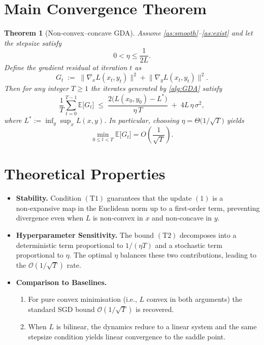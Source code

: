 \documentclass{article}
\newtheorem{theorem}{Theorem}
\newcommand{\E}{\mathbb{E}}
\begin{document}
\section*{Main Convergence Theorem}
\begin{theorem}[Non‑convex–concave GDA]\label{thm:main}
Assume \ref{as:smooth}–\ref{as:exist} and let the stepsize satisfy
\[
0<\eta\le \frac{1}{2L}.
\tag{T1}
\]
Define the \emph{gradient residual} at iteration \(t\) as
\[
G_{t}\;:=\;\big\|\nabla_{x}L(x_{t},y_{t})\big\|^{2}
            +\big\|\nabla_{y}L(x_{t},y_{t})\big\|^{2}.
\]
Then for any integer \(T\ge1\) the iterates generated by \eqref{alg:GDA} satisfy
\[
\frac{1}{T}\sum_{t=0}^{T-1}\E\!\big[G_{t}\big]
\;\le\;
\frac{2\big(L(x_{0},y_{0})-L^{*}\big)}{\eta\,T}
\;+\;
4L\,\eta\,\sigma^{2},
\tag{T2}
\]
where \(L^{*}:=\inf_{y}\sup_{x}L(x,y)\).  
In particular, choosing \(\eta = \Theta\!\big(1/\sqrt{T}\big)\) yields
\[
\min_{0\le t<T}\E\!\big[G_{t}\big]=O\!\left(\frac{1}{\sqrt{T}}\right).
\tag{T3}
\]
\end{theorem}

\section*{Theoretical Properties}
\begin{itemize}
\item \textbf{Stability.} Condition \((\text{T1})\) guarantees that the update \((1)\) is a non‑expansive map in the Euclidean norm up to a first‑order term, preventing divergence even when \(L\) is non‑convex in \(x\) and non‑concave in \(y\).
\item \textbf{Hyperparameter Sensitivity.} The bound \((\text{T2})\) decomposes into a deterministic term proportional to \(1/(\eta T)\) and a stochastic term proportional to \(\eta\). The optimal \(\eta\) balances these two contributions, leading to the \(\mathcal{O}(1/\sqrt{T})\) rate.
\item \textbf{Comparison to Baselines.}
    \begin{enumerate}
        \item For pure convex minimisation (i.e., \(L\) convex in both arguments) the standard SGD bound \(\mathcal{O}(1/\sqrt{T})\) is recovered.
        \item When \(L\) is bilinear, the dynamics reduce to a linear system and the same stepsize condition yields linear convergence to the saddle point.
    \end{enumerate}
\end{itemize}
\end{document}

